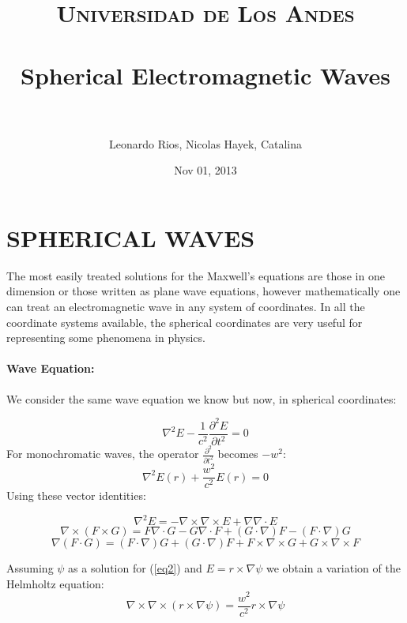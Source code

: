 \documentclass[paper=a4, fontsize=11pt]{scrartcl} %
\title{	
\normalfont \normalsize 
\textsc{Universidad de Los Andes} \\ [25pt] %
\horrule{0.5pt} \\[0.4cm] %
\huge Spherical Electromagnetic Waves  \\ %
\horrule{2pt} \\[0.5cm] %
}
\author{Leonardo Rios,  Nicolas Hayek,  Catalina} %
\date{\normalsize{Nov 01, 2013}} %
\numberwithin{equation}{section} %
\numberwithin{figure}{section} %
\numberwithin{table}{section} %
\begin{document}
\maketitle %



\section*{SPHERICAL WAVES}

The most easily treated solutions for the Maxwell's equations are those in one dimension or those written as plane wave equations, however mathematically one can treat an electromagnetic wave in any system of coordinates. In all the coordinate systems available, the spherical coordinates are very useful for representing some phenomena in physics. 

\paragraph*{Wave Equation:}
We consider the same wave equation we know but now, in spherical coordinates:

\begin{equation}
\nabla^2 E-\frac{1}{c^2}\frac{\partial^2 E}{\partial t^2} =0 
\end{equation}
For monochromatic waves, the operator $\frac{\partial^2 }{\partial t^2}$ becomes $-w^2$: \\
\begin{equation}
\nabla^2 E(r)+\frac{w^2}{c^2}E(r) =0 \label{eq2}
\end{equation} 
Using these vector identities:

\begin{equation}
\nabla^2 E=-\nabla \times \nabla \times E + \nabla\nabla \cdot E 
\end{equation} 
\begin{equation}
\nabla \times (F \times G)=F\nabla\cdot G -G \nabla \cdot F + (G\cdot\nabla)F - (F\cdot\nabla)G
\end{equation} 
\begin{equation}
\nabla(F\cdot G)=(F \cdot \nabla)G + (G \cdot \nabla)F+ F\times \nabla \times G + G \times \nabla \times F
\end{equation}

Assuming $\psi$ as a solution for (\ref{eq2}) and $E=r\times \nabla \psi$ we obtain a variation of the Helmholtz equation:
\begin{equation}
\nabla \times \nabla \times (r\times \nabla \psi)= \frac{w^2}{c^2} r\times \nabla \psi
\end{equation}
\end{document}
